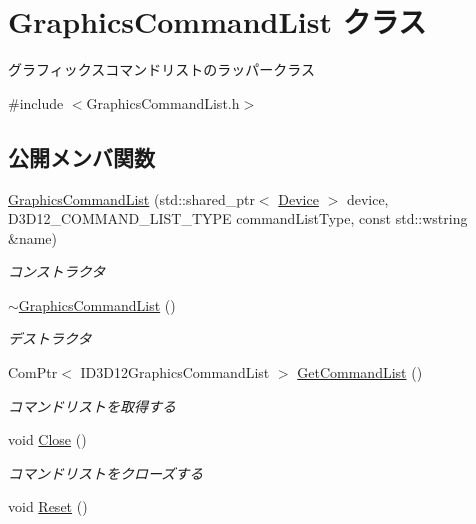 \hypertarget{class_graphics_command_list}{}\section{Graphics\+Command\+List クラス}
\label{class_graphics_command_list}


グラフィックスコマンドリストのラッパークラス  




{\ttfamily \#include $<$Graphics\+Command\+List.\+h$>$}

\subsection*{公開メンバ関数}
\begin{DoxyCompactItemize}
\item 
\mbox{\hyperlink{class_graphics_command_list_aaf8ac2a05856c02eb36021561f5c90c5}{Graphics\+Command\+List}} (std\+::shared\+\_\+ptr$<$ \mbox{\hyperlink{class_device}{Device}} $>$ device, D3\+D12\+\_\+\+C\+O\+M\+M\+A\+N\+D\+\_\+\+L\+I\+S\+T\+\_\+\+T\+Y\+PE command\+List\+Type, const std\+::wstring \&name)
\begin{DoxyCompactList}\small\item\em コンストラクタ \end{DoxyCompactList}\item 
\mbox{\hyperlink{class_graphics_command_list_aa115f0c056e3e5f81333852202e5dbaa}{$\sim$\+Graphics\+Command\+List}} ()
\begin{DoxyCompactList}\small\item\em デストラクタ \end{DoxyCompactList}\item 
Com\+Ptr$<$ I\+D3\+D12\+Graphics\+Command\+List $>$ \mbox{\hyperlink{class_graphics_command_list_a5b8cbeca32fbf3f2e7df74d87c593bec}{Get\+Command\+List}} ()
\begin{DoxyCompactList}\small\item\em コマンドリストを取得する \end{DoxyCompactList}\item 
void \mbox{\hyperlink{class_graphics_command_list_afafd3a85240e8ff36af439de3b8e5f7f}{Close}} ()
\begin{DoxyCompactList}\small\item\em コマンドリストをクローズする \end{DoxyCompactList}\item 
void \mbox{\hyperlink{class_graphics_command_list_a3054d5fc9a9e6ed2d24567eb54484a8f}{Reset}} ()

\end{DoxyCompactItemize}
